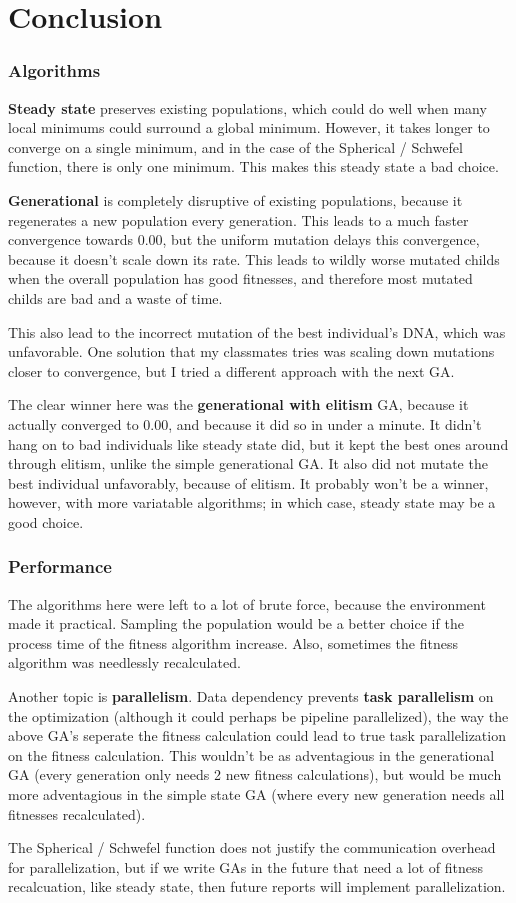 \documentclass[12pt]{article}
\begin{document}
\part{Conclusion}
\section{Algorithms}
\textbf{Steady state} preserves existing populations, which could do well when many local minimums could surround a global minimum. However, it takes longer to converge on a single minimum, and in the case of the Spherical / Schwefel function, there is only one minimum. This makes this steady state a bad choice.

\textbf{Generational} is completely disruptive of existing populations, because it regenerates a new population every generation. This leads to a much faster convergence towards 0.00, but the uniform mutation delays this convergence, because it doesn't scale down its rate. This leads to wildly worse mutated childs when the overall population has good fitnesses, and therefore most mutated childs are bad and a waste of time. 

This also lead to the incorrect mutation of the best individual's DNA, which was unfavorable. One solution that my classmates tries was scaling down mutations closer to convergence, but I tried a different approach with the next GA.

The clear winner here was the \textbf{generational with elitism} GA, because it actually converged to 0.00, and because it did so in under a minute. It didn't hang on to bad individuals like steady state did, but it kept the best ones around through elitism, unlike the simple generational GA. It also did not mutate the best individual unfavorably, because of elitism. It probably won't be a winner, however, with more variatable algorithms; in which case, steady state may be a good choice.

\section{Performance}
The algorithms here were left to a lot of brute force, because the environment made it practical. Sampling the population would be a better choice if the process time of the fitness algorithm increase. Also, sometimes the fitness algorithm was needlessly recalculated. 

Another topic is \textbf{parallelism}. Data dependency prevents \textbf{task parallelism} on the optimization (although it could perhaps be pipeline parallelized), the way the above GA's seperate the fitness calculation could lead to true task parallelization on the fitness calculation. This wouldn't be as adventagious in the generational GA (every generation only needs 2 new fitness calculations), but would be much more adventagious in the simple state GA (where every new generation needs all fitnesses recalculated). 

The Spherical / Schwefel function does not justify the communication overhead for parallelization, but if we write GAs in the future that need a lot of fitness recalcuation, like steady state, then future reports will implement parallelization. 
\end{document}
